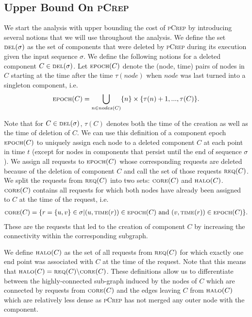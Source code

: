 \documentclass[a4paper,UKenglish,cleveref, autoref, thm-restate,authorcolumns]{lipics-v2019}
\newcommand{\adjDel}{\textsc{pCrep}}
\newcommand{\del}{\text{\scriptsize DEL}}
\newcommand{\core}{\text{\scriptsize CORE}}
\newcommand{\halo}{\text{\scriptsize HALO}}
\newcommand{\req}{\text{\scriptsize REQ}}
\newcommand{\epoch}{\text{\scriptsize EPOCH}}
\newcommand{\reqTime}{\text{\scriptsize TIME}}
\begin{document}
\subsection{Upper Bound On \adjDel{}}

We start the analysis with upper bounding the cost of \adjDel{} by introducing several notions that we will use throughout the analysis.
We define the set $\del(\sigma)$ as the set of components that were deleted by \adjDel{} during its execution given the input sequence $\sigma$.
We define the following notions for a deleted component $C\in\del{}(\sigma)$.
Let $\epoch{}(C)$ denote the (node, time) pairs of nodes in $C$ starting at the time after the time $\tau(node)$ when $node$ was last turned into a singleton component, i.e. 
\begin{align*}
\epoch{}(C)=\bigcup_{n\in nodes(C)}\{n\}\times\{\tau(n)+1,...,\tau(C)\}.
\end{align*}

Note that for $C\in\del(\sigma)$, $\tau(C)$ denotes both the time of the creation as well as the time of deletion of $C$. We can use this definition of a component epoch $\epoch(C)$ to uniquely assign each node to a deleted component $C$ at each point in time $t$ (except for nodes in components that persist until the end of sequence $\sigma$).
We assign all requests to $\epoch(C)$ whose corresponding requests are deleted because of the deletion of component $C$ and call the set of those requests $\req(C)$.
We split the requests from $\req{}(C)$ into two sets: $\core(C)$ and $\halo(C)$. $\core(C)$ contains all requests for which both nodes have already been assigned to $C$ at the time of the request, i.e. 
\begin{align*}
\core(C)=\{r=\{u,v\}\in\sigma| (u,\reqTime(r))\in \epoch(C)\text{ and } (v, \reqTime(r))\in \epoch(C)\}.
\end{align*}
These are the requests that led to the creation of component $C$ by increasing the connectivity within the corresponding subgraph.

We define $\halo(C)$ as the set of all requests from $\req(C)$ for which exactly one end point was associated with $C$ at the time of the request. Note that this means that $\halo(C)=\req(C)\backslash \core(C)$.
These definitions allow us to differentiate between the highly-connected sub-graph induced by the nodes of $C$ which are connected by requests from $\core(C)$ and the edges leaving $C$ from $\halo(C)$ which are relatively less dense as \adjDel{} has not merged any outer node with the component.
\end{document}
